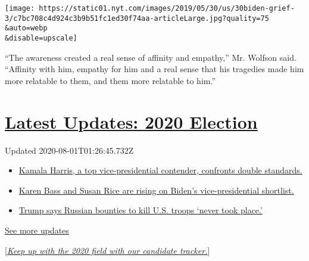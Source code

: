 \texttt{[image: https://static01.nyt.com/images/2019/05/30/us/30biden-grief-3/c7bc708c4d924c3b9b51fc1ed30f74aa-articleLarge.jpg?quality=75\\\&auto=webp\\\&disable=upscale]}

``The awareness created a real sense of affinity and empathy,'' Mr.
Wolfson said. ``Affinity with him, empathy for him and a real sense that
his tragedies made him more relatable to them, and them more relatable
to him.''

\hypertarget{latest-updates-2020-election}{%
\section{\texorpdfstring{\href{https://www.nytimes.com/2020/07/31/us/elections/biden-vs-trump.html?action=click\&pgtype=Article\&state=default\&region=MAIN_CONTENT_1\&context=storylines_live_updates}{Latest
Updates: 2020
Election}}{Latest Updates: 2020 Election}}\label{latest-updates-2020-election}}

Updated 2020-08-01T01:26:45.732Z

\begin{itemize}
\tightlist
\item
  \href{https://www.nytimes.com/2020/07/31/us/elections/biden-vs-trump.html?action=click\&pgtype=Article\&state=default\&region=MAIN_CONTENT_1\&context=storylines_live_updates\#link-29fdff45}{Kamala
  Harris, a top vice-presidential contender, confronts double
  standards.}
\item
  \href{https://www.nytimes.com/2020/07/31/us/elections/biden-vs-trump.html?action=click\&pgtype=Article\&state=default\&region=MAIN_CONTENT_1\&context=storylines_live_updates\#link-13ec3d9c}{Karen
  Bass and Susan Rice are rising on Biden's vice-presidential
  shortlist.}
\item
  \href{https://www.nytimes.com/2020/07/31/us/elections/biden-vs-trump.html?action=click\&pgtype=Article\&state=default\&region=MAIN_CONTENT_1\&context=storylines_live_updates\#link-49e9a016}{Trump
  says Russian bounties to kill U.S. troops `never took place.'}
\end{itemize}

\href{https://www.nytimes.com/2020/07/31/us/elections/biden-vs-trump.html?action=click\&pgtype=Article\&state=default\&region=MAIN_CONTENT_1\&context=storylines_live_updates}{See
more updates}

{[}\href{https://www.nytimes.com/interactive/2019/us/politics/2020-presidential-candidates.html?action=click\&module=Intentional\&pgtype=Article}{\emph{Keep
up with the 2020 field with our candidate tracker.}}{]}

